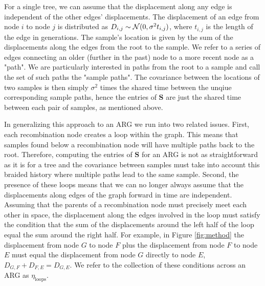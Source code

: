 For a single tree, we can assume that the displacement along any edge is independent of the other edges' displacements. The displacement of an edge from node $i$ to node $j$ is distributed as $D_{i,j} \sim \mbox{${\mathcal N}$}(0,\sigma^2 t_{i,j})$, where $t_{i,j}$ is the length of the edge in generations. The sample's location is given by the sum of the displacements along the edges from the root to the sample. We refer to a series of edges connecting an older (further in the past) node to a more recent node as a "path". We are particularly interested in paths from the root to a sample and call the set of such paths the "sample paths". The covariance between the locations of two samples is then simply $\sigma^2$ times the shared time between the unqiue corresponding sample paths, hence the entries of $\mathbf{S}$ are just the shared time between each pair of samples, as mentioned above. 

In generalizing this approach to an ARG we run into two related issues. First, each recombination node creates a loop within the graph. This means that samples found below a recombination node will have multiple paths back to the root. Therefore, computing the entries of $\mathbf{S}$ for an ARG is not as straightforward as it is for a tree and the covariance between samples must take into account this braided history where multiple paths lead to the same sample. Second, the presence of these loops means that we can no longer always assume that the displacements along edges of the graph forward in time are independent. Assuming that the parents of a recombination node must precisely meet each other in space, the displacement along the edges involved in the loop must satisfy the condition that the sum of the displacements around the left half of the loop equal the sum around the right half. For example, in Figure \ref{fig:method} the displacement from node $G$ to node $F$ plus the displacement from node $F$ to node $E$ must equal the displacement from node $G$ directly to node $E$, $D_{G,F} + D_{F,E} = D_{G,E}$. We refer to the collection of these conditions across an ARG as $\eta_\mathrm{loops}$.


